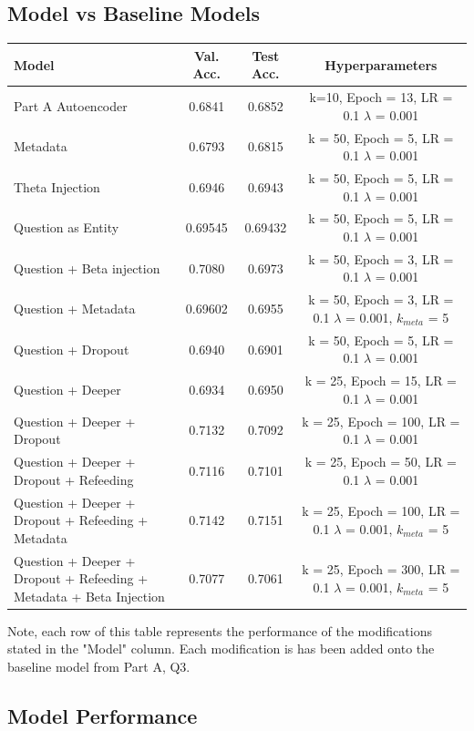 \documentclass{article}
\begin{document}
\subsection{Model vs Baseline Models}
\begin{table}[htbp!]
\centering
\begin{tabular}{|m{5cm}|c|c|c|}
\hline
Model & Val. Acc. & Test Acc.& Hyperparameters \\
\hline
Part A Autoencoder & 0.6841 & 0.6852 & k=10, Epoch = 13, LR = 0.1 $\lambda$ = 0.001 \\
\hline
Metadata & 0.6793 & 0.6815 & k = 50, Epoch = 5, LR = 0.1 $\lambda$ = 0.001\\
\hline
Theta Injection & 0.6946 & 0.6943 & k = 50, Epoch = 5, LR = 0.1 $\lambda$ = 0.001\\
\hline
Question as Entity & 0.69545 & 0.69432 & k = 50, Epoch = 5, LR = 0.1 $\lambda$ = 0.001\\
\hline
Question + Beta injection & 0.7080 & 0.6973 & k = 50, Epoch = 3, LR = 0.1 $\lambda$ = 0.001\\
\hline
Question + Metadata& 0.69602 & 0.6955 & k = 50, Epoch = 3, LR = 0.1 $\lambda$ = 0.001, $k_{meta}$ = 5\\
\hline
Question + Dropout & 0.6940 & 0.6901 & k = 50, Epoch = 5, LR = 0.1 $\lambda$ = 0.001\\
\hline
Question + Deeper & 0.6934 & 0.6950 & k = 25, Epoch = 15, LR = 0.1 $\lambda$ = 0.001\\
\hline
Question + Deeper + Dropout & 0.7132 & 0.7092 & k = 25, Epoch = 100, LR = 0.1 $\lambda$ = 0.001\\
\hline
 Question + Deeper + Dropout + Refeeding& 0.7116 & 0.7101 & k = 25, Epoch = 50, LR = 0.1 $\lambda$ = 0.001\\
 \hline
Question + Deeper + Dropout + Refeeding + Metadata& 0.7142 & 0.7151 & k = 25, Epoch = 100, LR = 0.1 $\lambda$ = 0.001, $k_{meta}$ = 5\\
 \hline
Question + Deeper + Dropout + Refeeding + Metadata + Beta Injection & 0.7077 & 0.7061 & k = 25, Epoch = 300, LR = 0.1 $\lambda$ = 0.001, $k_{meta}$ = 5\\
 \hline
\end{tabular}
\end{table}
Note, each row of this table represents the performance of the modifications stated in the "Model" column. Each modification is has been added onto the baseline model from Part A, Q3.\\
\subsection{Model Performance}
\end{document}
